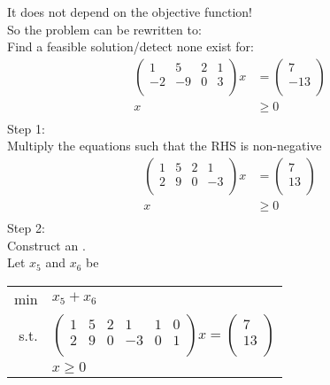 \documentclass[letterpaper, 12pt]{article}
\newcommand{\red}[1]{{\color{red}{#1}}}
\begin{document}
    \red{Remark:} It does not depend on the objective function!\\
    So the problem can be rewritten to:\\
    \bigskip
    Find a feasible solution/detect none exist for:\\
    \begin{align*}
        \begin{pmatrix}
            1 & 5 & 2 & 1\\
            -2 & -9 & 0 & 3\\
        \end{pmatrix}x &= \begin{pmatrix}
            7\\-13\\
        \end{pmatrix}\\
        x &\geq 0\\
    \end{align*}
    Step 1:\\
    Multiply the equations such that the RHS is non-negative\\
    \begin{align*}
        \begin{pmatrix}
            1 & 5 & 2 & 1\\
            2 & 9 & 0 & -3\\
        \end{pmatrix}x &= \begin{pmatrix}
            7\\13\\
        \end{pmatrix}\\
        x &\geq 0\\
    \end{align*}
    Step 2:\\
    Construct an \red{auxiliary problem}.\\
    Let $x_5$ and $x_6$ be \red{auxiliary variables}\\
    \begin{center}
        \begin{tabular}{rl}
            min & $x_5 + x_6$\\
            s.t. & $\begin{pmatrix}
                1 & 5 & 2 & 1 & 1 & 0\\
                2 & 9 & 0 & -3 & 0 & 1\\
            \end{pmatrix}x = \begin{pmatrix}
                7\\13\\
            \end{pmatrix}$\\
            & $x \geq 0$\\
        \end{tabular}
    \end{center}
\end{document}
